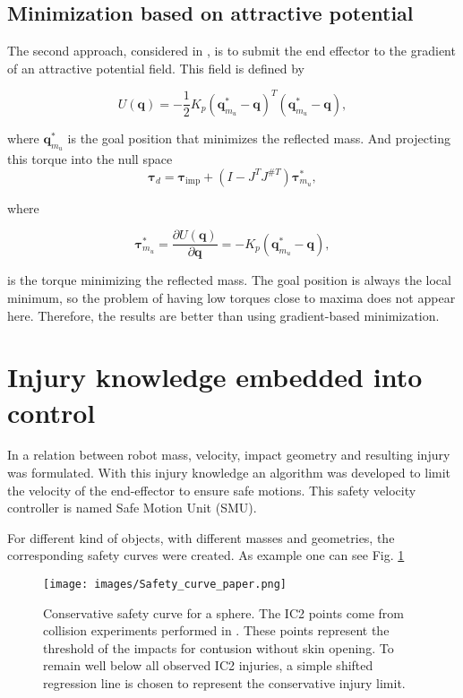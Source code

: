 \subsection{Minimization based on attractive potential}
\label{subsec:minim_potential_intro}


The second approach, considered in \cite{paper_iros2017}, is to submit the end effector to the gradient of an attractive potential field. This field is defined by 


\begin{equation}
U(\mathbf{q}) = - \frac{1}{2} K_p (\mathbf{q}_{m_u}^\ast - \mathbf{q})^T (\mathbf{q}_{m_u}^\ast - \mathbf{q}), \label{eq:potential_intro}
\end{equation}

where $\mathbf{q}_{m_u}^\ast$ is the goal position that minimizes the reflected mass. And projecting this torque into the null space
\begin{equation}
\mathbf{\tau}_d = \mathbf{\tau}_\mathrm{imp} + (I - J^T J^{\#T}) \mathbf{\tau}_{m_u}^\ast, \label{eq:potential_controller_intro}
\end{equation}

where 

\begin{equation}
\mathbf{\tau}_{m_u}^\ast = \frac{\partial {U(\mathbf{q})}}{\partial {\mathbf{q}}} = - K_p (\mathbf{q}_{m_u}^\ast - \mathbf{q}),
\label{eq:torque_pot_intro}
\end{equation}

is the torque minimizing the reflected mass.
The goal position is always the local minimum, so the problem of having low torques close to maxima does not appear here. Therefore, the results are better than using gradient-based minimization. 

\section{Injury knowledge embedded into control}
\label{sec:Samistuff}

In \cite{sammi_paper} a relation between robot mass, velocity, impact geometry
and resulting injury was formulated. With this injury knowledge an algorithm was developed to limit the velocity of the end-effector to ensure safe motions. This safety velocity controller is named Safe Motion Unit (SMU). 

For different kind of objects, with different masses and geometries, the corresponding safety curves were created. As example one can see Fig. \ref{fig:Safety_curve_paper}


\begin{figure}[htb]
	\centerline{
		\texttt{[image: images/Safety\_curve\_paper.png]}}
	\caption{Conservative safety curve for a sphere. The IC2 points come from collision experiments performed in \cite{sammi_paper}. These points represent the threshold of the impacts for contusion without skin opening. To remain well below all observed IC2 injuries, a simple shifted regression line is chosen to represent the conservative injury limit.}
	\label{fig:Safety_curve_paper}
\end{figure}
 

